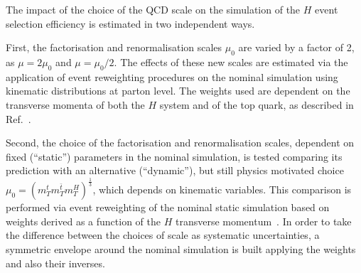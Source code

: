 The impact of the choice of the QCD scale on the simulation of the \ttbar$H$ event selection efficiency is estimated in two independent ways. 

First, the factorisation and renormalisation scales $\mu_{0}$ are varied by a factor of 2, as $\mu = 2\mu_{0}$ and $\mu = \mu_{0}/2$. The effects of these new scales are estimated via the application of event reweighting procedures on the nominal simulation using kinematic distributions at parton level. The weights used are dependent on the transverse momenta of both the \ttbar$H$ system and of the top quark, as described in Ref.~\cite{Guindon:1638000}. 

Second, the choice of the factorisation and renormalisation scales, dependent on fixed (``static'') parameters in the nominal simulation, is tested comparing its prediction with an alternative (``dynamic''), but still physics motivated choice $\mu_{0} = (m_{T}^{t}m_{T}^{\bar{t}}m_{T}^{H})^{\frac{1}{3}}$, which depends on kinematic variables. This comparison is performed via event reweighting of the nominal static simulation based on weights derived as a function of the \ttbar$H$ transverse momentum~\cite{Guindon:1638000}. In order to take the difference between the choices of scale as systematic uncertainties, a symmetric envelope around the nominal simulation is built applying the weights and also their inverses.

